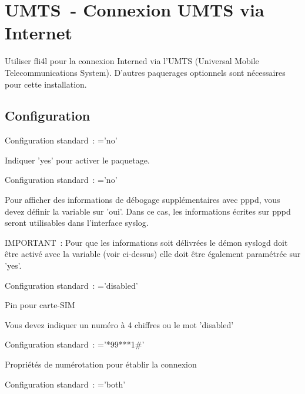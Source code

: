 

{
\section {UMTS~- Connexion UMTS via Internet}
}

Utiliser fli4l pour la connexion Interned via l'UMTS (Universal Mobile
Telecommunications System). D'autres paquerages optionnels sont nécessaires pour
cette installation.

\subsection{Configuration}

\begin{description}

  Configuration standard~: ='no'

  Indiquer 'yes' pour activer le paquetage.


  Configuration standard~: ='no'

  Pour afficher des informations de débogage supplémentaires avec pppd, vous
  devez définir la variable  sur 'oui'. Dans ce cas, les
  informations écrites sur pppd seront utilisables dans l'interface syslog.

  IMPORTANT~: Pour que les informations soit délivrées le démon syslogd doit
  être activé avec la variable  (voir ci-dessus) elle doit
  être également paramétrée sur 'yes'.


  Configuration standard~: ='disabled'

  Pin pour carte-SIM

  Vous devez indiquer un numéro à 4 chiffres ou le mot 'disabled'


  Configuration standard~: ='*99***1\#'

  Propriétés de numérotation pour établir la connexion


  Configuration standard~: ='both'


\end{description}
